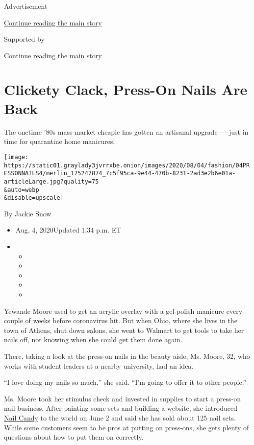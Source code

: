 Advertisement

\protect\hyperlink{after-top}{Continue reading the main story}

Supported by

\protect\hyperlink{after-sponsor}{Continue reading the main story}

\hypertarget{clickety-clack-press-on-nails-are-back}{%
\section{Clickety Clack, Press-On Nails Are
Back}\label{clickety-clack-press-on-nails-are-back}}

The onetime '80s mass-market cheapie has gotten an artisanal upgrade ---
just in time for quarantine home manicures.

\texttt{[image: https://static01.graylady3jvrrxbe.onion/images/2020/08/04/fashion/04PRESSONNAILS4/merlin\_175247874\_7c5f95ca-9e44-470b-8231-2ad3e2b6e01a-articleLarge.jpg?quality=75\\\&auto=webp\\\&disable=upscale]}

By Jackie Snow

\begin{itemize}
\item
  Aug. 4, 2020Updated 1:34 p.m. ET
\item
  \begin{itemize}
  \item
  \item
  \item
  \item
  \item
  \end{itemize}
\end{itemize}

Yewande Moore used to get an acrylic overlay with a gel-polish manicure
every couple of weeks before coronavirus hit. But when Ohio, where she
lives in the town of Athens, shut down salons, she went to Walmart to
get tools to take her nails off, not knowing when she could get them
done again.

There, taking a look at the press-on nails in the beauty aisle, Ms.
Moore, 32, who works with student leaders at a nearby university, had an
idea.

``I love doing my nails so much,'' she said. ``I'm going to offer it to
other people.''

Ms. Moore took her stimulus check and invested in supplies to start a
press-on nail business. After painting some sets and building a website,
she introduced \href{https://nailcandypressons.squarespace.com/}{Nail
Candy} to the world on June 2 and said she has sold about 125 nail sets.
While some customers seem to be pros at putting on press-ons, she gets
plenty of questions about how to put them on correctly.

